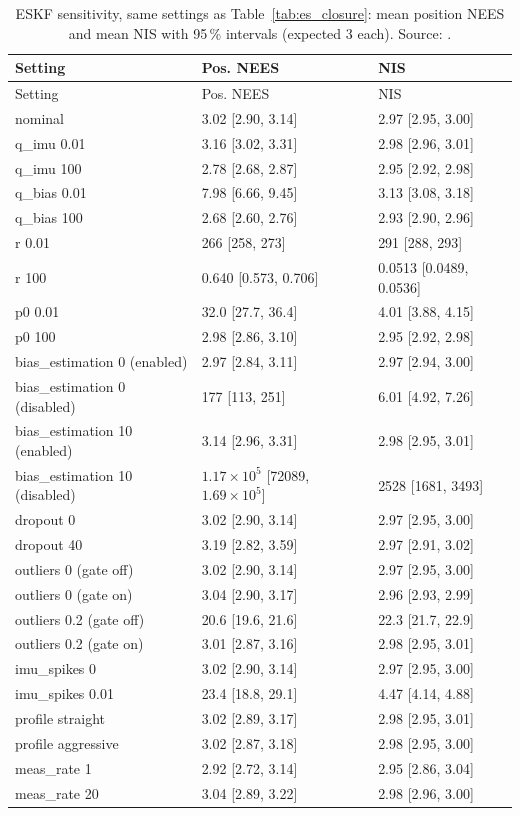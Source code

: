 {\scriptsize
\begin{longtable}{lll}
\caption{ESKF sensitivity, same settings as Table~\ref{tab:es_closure}: mean position NEES and mean NIS with 95\,\% intervals (expected 3 each). Source: .}\label{tab:es_closure_cons}\\
\toprule
Setting & Pos. NEES & NIS \\
\midrule
\endfirsthead
\toprule
Setting & Pos. NEES & NIS \\
\midrule
\endhead
nominal & 3.02 [2.90, 3.14] & 2.97 [2.95, 3.00] \\
q\_imu 0.01 & 3.16 [3.02, 3.31] & 2.98 [2.96, 3.01] \\
q\_imu 100 & 2.78 [2.68, 2.87] & 2.95 [2.92, 2.98] \\
q\_bias 0.01 & 7.98 [6.66, 9.45] & 3.13 [3.08, 3.18] \\
q\_bias 100 & 2.68 [2.60, 2.76] & 2.93 [2.90, 2.96] \\
r 0.01 & 266 [258, 273] & 291 [288, 293] \\
r 100 & 0.640 [0.573, 0.706] & 0.0513 [0.0489, 0.0536] \\
p0 0.01 & 32.0 [27.7, 36.4] & 4.01 [3.88, 4.15] \\
p0 100 & 2.98 [2.86, 3.10] & 2.95 [2.92, 2.98] \\
bias\_estimation 0 (enabled) & 2.97 [2.84, 3.11] & 2.97 [2.94, 3.00] \\
bias\_estimation 0 (disabled) & 177 [113, 251] & 6.01 [4.92, 7.26] \\
bias\_estimation 10 (enabled) & 3.14 [2.96, 3.31] & 2.98 [2.95, 3.01] \\
bias\_estimation 10 (disabled) & $1.17\times10^{5}$ [72089, $1.69\times10^{5}$] & 2528 [1681, 3493] \\
dropout 0 & 3.02 [2.90, 3.14] & 2.97 [2.95, 3.00] \\
dropout 40 & 3.19 [2.82, 3.59] & 2.97 [2.91, 3.02] \\
outliers 0 (gate off) & 3.02 [2.90, 3.14] & 2.97 [2.95, 3.00] \\
outliers 0 (gate on) & 3.04 [2.90, 3.17] & 2.96 [2.93, 2.99] \\
outliers 0.2 (gate off) & 20.6 [19.6, 21.6] & 22.3 [21.7, 22.9] \\
outliers 0.2 (gate on) & 3.01 [2.87, 3.16] & 2.98 [2.95, 3.01] \\
imu\_spikes 0 & 3.02 [2.90, 3.14] & 2.97 [2.95, 3.00] \\
imu\_spikes 0.01 & 23.4 [18.8, 29.1] & 4.47 [4.14, 4.88] \\
profile straight & 3.02 [2.89, 3.17] & 2.98 [2.95, 3.01] \\
profile aggressive & 3.02 [2.87, 3.18] & 2.98 [2.95, 3.00] \\
meas\_rate 1 & 2.92 [2.72, 3.14] & 2.95 [2.86, 3.04] \\
meas\_rate 20 & 3.04 [2.89, 3.22] & 2.98 [2.96, 3.00] \\
\bottomrule
\end{longtable}
}
